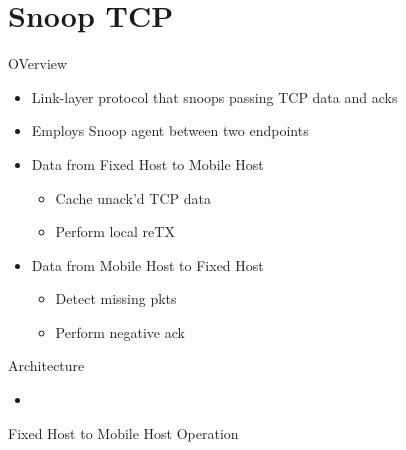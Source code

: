 \section{Snoop TCP}
OVerview
\begin{itemize}
	\item Link-layer protocol that snoops passing TCP data and acks
	\item Employs Snoop agent between two endpoints
	\item Data from Fixed Host to Mobile Host
	\begin{itemize}
		\item Cache unack'd TCP data
		\item Perform local reTX
	\end{itemize}
	\item Data from Mobile Host to Fixed Host
	\begin{itemize}
		\item Detect missing pkts
		\item Perform negative ack
	\end{itemize}
\end{itemize}
Architecture
\begin{itemize}
	\item
\end{itemize}
Fixed Host to Mobile Host Operation
